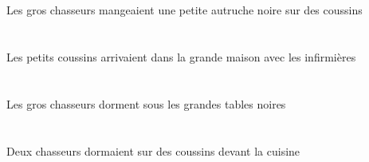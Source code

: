 \begin{exe}
    \INDPlOblP{}   \coussinBPlOblP{}   \SURP{}   \DEFPlErgP{}   \grosCPlP{}   \chasseurCPlErgP{}   \INDSgAbsP{}   \petitBSgP{}   \noirBSgP{}   \autrucheBSgAbsP{}  \mangerVtPstBSgP{} \\
    \INDPlOblG{}   \coussinBPlOblG{}   \SURG{}   \DEFPlErgG{}   \grosCPlG{}   \chasseurCPlErgG{}   \INDSgAbsG{}   \petitBSgG{}   \noirBSgG{}   \autrucheBSgAbsG{}  \mangerVtPstBSgG{} \\
 Les gros chasseurs mangeaient une petite autruche noire sur des coussins
\ex\glll
    \DEFPlObl{}   \infirmiereAPlObl{}   \AVEC{}   \DEFPlAbs{}   \petitBPl{}   \coussinBPlAbs{}    \DEFSgObl{}   \grandDSg{}   \maisonDSgObl{}   \DANS{}  \arriverViPstBPl{} \\
    \DEFPlOblP{}   \infirmiereAPlOblP{}   \AVECP{}   \DEFPlAbsP{}   \petitBPlP{}   \coussinBPlAbsP{}    \DEFSgOblP{}   \grandDSgP{}   \maisonDSgOblP{}   \DANSP{}  \arriverViPstBPlP{} \\
    \DEFPlOblG{}   \infirmiereAPlOblG{}   \AVECG{}   \DEFPlAbsG{}   \petitBPlG{}   \coussinBPlAbsG{}    \DEFSgOblG{}   \grandDSgG{}   \maisonDSgOblG{}   \DANSG{}  \arriverViPstBPlG{} \\
 Les petits coussins arrivaient dans la grande maison avec les infirmières
\ex\glll
   \DEFPlAbs{}   \grosCPl{}   \chasseurCPlAbs{}    \DEFPlObl{}   \grandDPl{}   \noirDPl{}   \tableDPlObl{}   \SOUS{}  \dormirViPrsCPl{} \\
   \DEFPlAbsP{}   \grosCPlP{}   \chasseurCPlAbsP{}    \DEFPlOblP{}   \grandDPlP{}   \noirDPlP{}   \tableDPlOblP{}   \SOUSP{}  \dormirViPrsCPlP{} \\
   \DEFPlAbsG{}   \grosCPlG{}   \chasseurCPlAbsG{}    \DEFPlOblG{}   \grandDPlG{}   \noirDPlG{}   \tableDPlOblG{}   \SOUSG{}  \dormirViPrsCPlG{} \\
 Les gros chasseurs dorment sous les grandes tables noires
\ex\glll
    \DEFSgObl{}   \cuisineDSgObl{}   \DEVANT{}   \INDDuAbs{}   \chasseurCDuAbs{}    \INDPlObl{}   \coussinBPlObl{}   \SUR{}  \dormirViPstCDu{} \\
    \DEFSgOblP{}   \cuisineDSgOblP{}   \DEVANTP{}   \INDDuAbsP{}   \chasseurCDuAbsP{}    \INDPlOblP{}   \coussinBPlOblP{}   \SURP{}  \dormirViPstCDuP{} \\
    \DEFSgOblG{}   \cuisineDSgOblG{}   \DEVANTG{}   \INDDuAbsG{}   \chasseurCDuAbsG{}    \INDPlOblG{}   \coussinBPlOblG{}   \SURG{}  \dormirViPstCDuG{} \\
 Deux chasseurs dormaient sur des coussins devant la cuisine
\ex\glll
   \DEFSgAbs{}   \coyoteCSgAbs{}    \DEFSgObl{}    \DEFSgObl{}   \villageCSgObl{}   \DE{}   \jauneDSg{}   \maisonDSgObl{}   \DANS{}  \entrerViPrsCSg{} \\

\end{exe}
